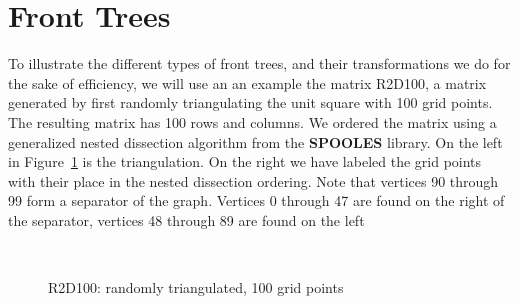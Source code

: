 \section{Front Trees}
\label{section:front-trees}
\par
To illustrate the different types of front trees, and their
transformations we do for the sake of efficiency,
we will use an an example the matrix R2D100, a matrix generated by
first randomly triangulating the unit square with 100 grid points.
The resulting matrix has 100 rows and columns.
We ordered the matrix using a generalized nested dissection
algorithm from the {\bf SPOOLES} library. 
On the left in Figure~\ref{fig:R2D100} is the triangulation.
On the right we have labeled the grid points with their place in
the nested dissection ordering.
Note that vertices 90 through 99 form a separator of the graph.
Vertices 0 through 47 are found on the right of the separator, 
vertices 48 through 89 are found on the left
\par
\begin{figure}[htbp]
\caption{R2D100: randomly triangulated, 100 grid points}
\label{fig:R2D100}
\begin{center}
\mbox{
}
\mbox{
}
\end{center}
\end{figure}
\par
